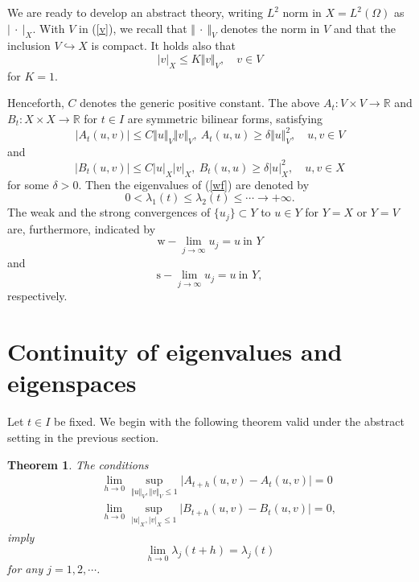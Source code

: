 \documentclass[final,a4paper]{jmsj}
\newcommand{\R}{\mathbb R}
\theoremstyle{thmstyleone}%
\newtheorem{theorem}{Theorem}
\theoremstyle{thmstyletwo}%
\theoremstyle{thmstylethree}%
\begin{document}
We are ready to develop an abstract theory, writing $L^2$ norm in $X=L^2(\Omega)$ as $\vert \ \cdot \ \vert_X$. With $V$ in (\ref{v}), we recall that $\Vert \ \cdot \ \Vert_V$ denotes the norm in $V$ and that the inclusion $V\hookrightarrow X$ is compact. It holds also that 
\begin{equation} 
\vert v\vert_X\leq K\Vert v\Vert_V, \quad v\in V 
 \label{contie}
\end{equation} 
for $K=1$. 


Henceforth, $C$ denotes the generic positive constant. 
The above $A_t:V\times V\rightarrow \R$ and $B_t:X\times X\rightarrow \R$ for $t\in I$ are symmetric bilinear forms, satisfying 
\begin{equation}  
\vert A_t(u,v)\vert \leq C\Vert u\Vert_V\Vert v\Vert_V, \ A_t(u,u)\geq \delta \Vert u\Vert_V^2, \quad u,v\in V 
 \label{coercive1}
\end{equation} 
and 
\begin{equation} 
\vert B_t(u,v)\vert \leq C\vert u\vert_X\vert v\vert_X, \ B_t(u,u)\geq \delta\vert u\vert_X^2, \quad u, v\in X 
 \label{coercive2}
\end{equation} 
for some $\delta>0$. Then the eigenvalues of (\ref{wf}) are denoted by 
\[ 0<\lambda_1(t)\leq \lambda_2(t)\leq \cdots \rightarrow +\infty. \] 
The weak and the strong convergences of $\{ u_j\}\subset Y$ to $u\in Y$ for $Y=X$ or $Y=V$ are, furthermore, indicated by 
\[ \mbox{w}-\lim_{j\rightarrow \infty}u_j=u  \ \mbox{in $Y$} \] 
and 
\[ \mbox{s}-\lim_{j\rightarrow \infty}u_j=u \ \mbox{in $Y$}, \] 
respectively. 



\section{Continuity of eigenvalues and eigenspaces}\label{sec3}

Let $t\in I$ be fixed. We begin with the following theorem valid under the abstract setting in the previous section. 

\begin{theorem}\label{thm2}
The conditions   
\begin{eqnarray} 
& & \lim_{h\rightarrow 0}\sup_{\Vert u\Vert_V, \Vert v\Vert_V\leq 1}
\vert A_{t+h}(u,v)-A_t(u,v)\vert =0 \nonumber\\ 
& & \lim_{h\rightarrow 0}\sup_{\vert u\vert_X, \vert v\vert_X\leq 1}
\vert B_{t+h}(u,v)-B_t(u,v)\vert=0,  
 \label{18ab} 
\end{eqnarray}  
imply  
\begin{equation} 
\lim_{h\rightarrow 0}\lambda_j(t+h)=\lambda_j(t) 
 \label{16}
\end{equation} 
for any $j=1,2, \cdots$.    
\end{theorem} 
\end{document}
